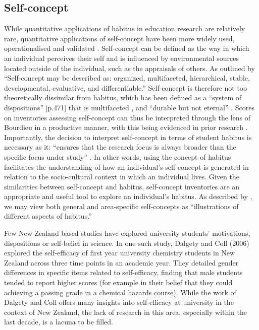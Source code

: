 \subsection*{Self-concept}
\label{selfconcept}
While quantitative applications of habitus in education research are relatively rare, quantitative applications of self-concept have been more widely used, operationalised and validated \cite{marsh2014academic, hattie2014self}. Self-concept can be defined as the way in which an individual perceives their self \cite{rosenberg1979conceiving, shavelson1976self} and is influenced by environmental sources located outside of the individual, such as the appraisals of others. As outlined by \cite[p.488]{shavelson1976self} ``Self-concept may be described as: organized, multifaceted, hierarchical, stable, developmental,
evaluative, and differentiable.'' Self-concept is therefore not too theoretically dissimilar from habitus, which has been defined as a ``system of dispositions'' [p.471] that is multifaceted \cite{Nash1999}, and ``durable but not eternal'' \cite{Bourdieu1984}. Scores on inventories assessing self-concept can thus be interpreted through the lens of Bourdieu in a productive manner, with this being evidenced in prior research \cite{dumais2002cultural}.  Importantly, the decision to interpret self-concept in terms of student habitus is necessary as it: ``ensures that the research focus is always broader than the specific focus under study'' \cite{Reay_2004}. In other words, using the concept of habitus facilitates the understanding of how an individual's self-concept is generated in relation to the socio-cultural context in which an individual lives. Given the similarities between self-concept and habitus, self-concept inventories are an appropriate and useful tool to explore an individual's habitus. As described by \cite[p.395]{bodovski2014adolescents}, we may view both general and area-specific self-concepts as ``illustrations of different aspects of habitus.''  

Few New Zealand based studies have explored university students' motivations, dispositions or self-belief in science. In one such study, Dalgety and Coll (2006) \cite{dalgety2006exploring} explored the self-efficacy of first year university chemistry students in New Zealand across three time points in an academic year. They detailed gender differences in specific items related to self-efficacy, finding that male students tended to report higher scores (for example in their belief that they could achieving a passing grade in a chemical hazards course). While the work of Dalgety and Coll offers many insights into self-efficacy at university in the context of New Zealand, the lack of research in this area, especially within the last decade, is a lacuna to be filled. 


